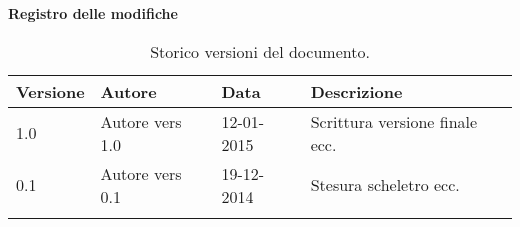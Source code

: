 \begin{Large}
	\textbf{Registro delle modifiche}
\end{Large}

\begin{longtable}{|l|l|l|p{}|}
\hline
\textbf{Versione} & \textbf{Autore} & \textbf{Data} & \textbf{Descrizione} \\
\hline
1.0 & Autore vers 1.0 & 12-01-2015 & Scrittura versione finale ecc. \\
\hline
0.1 & Autore vers 0.1 & 19-12-2014 & Stesura scheletro ecc. \\
\hline
\caption{Storico versioni del documento.}
\end{longtable}

